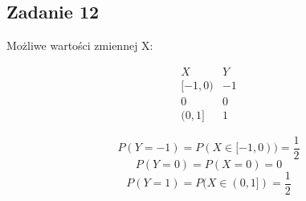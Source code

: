 \subsection{Zadanie 12}

Możliwe wartości zmiennej X:

$$
\begin{array}{c|c}
X & Y\\
\hline
[-1, 0) & -1\\
0 & 0\\
(0, 1] & 1
\end{array} 
$$

$$
P(Y=-1) = P(X\in [-1, 0)) = \frac{1}{2}
$$
$$
P(Y=0) = P(X=0) =  0
$$
$$
P(Y=1) = P(X \in (0, 1]) = \frac{1}{2}
$$
